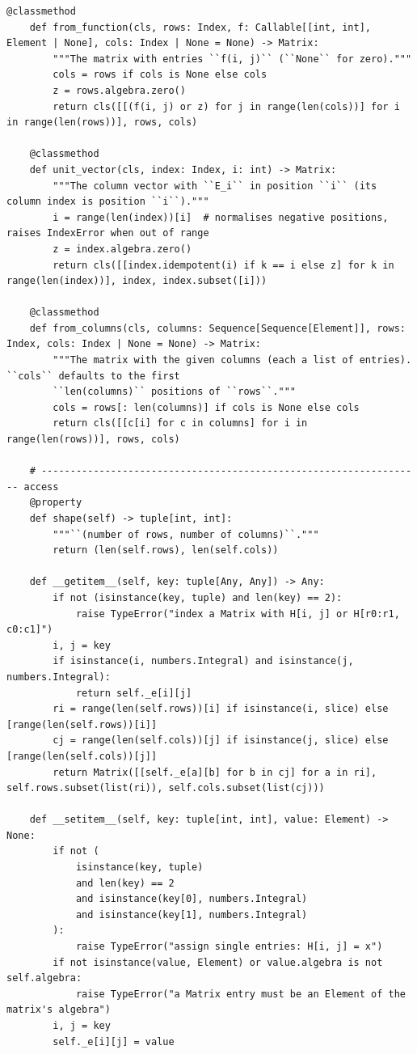 \documentclass[12pt, a4paper]{report}
\theoremstyle{plain}
\theoremstyle{definition}
\theoremstyle{remark}
\theoremstyle{plain}
\begin{document}
\begin{lstlisting}[style=dsqcode]
    @classmethod
    def from_function(cls, rows: Index, f: Callable[[int, int], Element | None], cols: Index | None = None) -> Matrix:
        """The matrix with entries ``f(i, j)`` (``None`` for zero)."""
        cols = rows if cols is None else cols
        z = rows.algebra.zero()
        return cls([[(f(i, j) or z) for j in range(len(cols))] for i in range(len(rows))], rows, cols)

    @classmethod
    def unit_vector(cls, index: Index, i: int) -> Matrix:
        """The column vector with ``E_i`` in position ``i`` (its column index is position ``i``)."""
        i = range(len(index))[i]  # normalises negative positions, raises IndexError when out of range
        z = index.algebra.zero()
        return cls([[index.idempotent(i) if k == i else z] for k in range(len(index))], index, index.subset([i]))

    @classmethod
    def from_columns(cls, columns: Sequence[Sequence[Element]], rows: Index, cols: Index | None = None) -> Matrix:
        """The matrix with the given columns (each a list of entries). ``cols`` defaults to the first
        ``len(columns)`` positions of ``rows``."""
        cols = rows[: len(columns)] if cols is None else cols
        return cls([[c[i] for c in columns] for i in range(len(rows))], rows, cols)

    # ------------------------------------------------------------------ access
    @property
    def shape(self) -> tuple[int, int]:
        """``(number of rows, number of columns)``."""
        return (len(self.rows), len(self.cols))

    def __getitem__(self, key: tuple[Any, Any]) -> Any:
        if not (isinstance(key, tuple) and len(key) == 2):
            raise TypeError("index a Matrix with H[i, j] or H[r0:r1, c0:c1]")
        i, j = key
        if isinstance(i, numbers.Integral) and isinstance(j, numbers.Integral):
            return self._e[i][j]
        ri = range(len(self.rows))[i] if isinstance(i, slice) else [range(len(self.rows))[i]]
        cj = range(len(self.cols))[j] if isinstance(j, slice) else [range(len(self.cols))[j]]
        return Matrix([[self._e[a][b] for b in cj] for a in ri], self.rows.subset(list(ri)), self.cols.subset(list(cj)))

    def __setitem__(self, key: tuple[int, int], value: Element) -> None:
        if not (
            isinstance(key, tuple)
            and len(key) == 2
            and isinstance(key[0], numbers.Integral)
            and isinstance(key[1], numbers.Integral)
        ):
            raise TypeError("assign single entries: H[i, j] = x")
        if not isinstance(value, Element) or value.algebra is not self.algebra:
            raise TypeError("a Matrix entry must be an Element of the matrix's algebra")
        i, j = key
        self._e[i][j] = value


\end{lstlisting}
\end{document}
